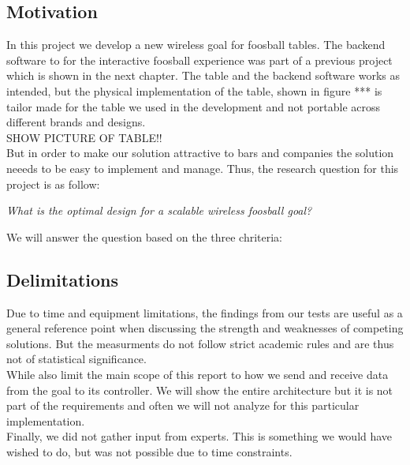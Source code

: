 \subsection{Motivation}
In this project we develop a new wireless goal for foosball tables. The backend software to for the interactive foosball experience was part of a previous project which is shown in the next chapter. The table and the backend software works as intended, but the physical implementation of the table, shown in figure *** is tailor made for the table we used in the development and not portable across different brands and designs. 
\\
SHOW PICTURE OF TABLE!!\\

But in order to make our solution attractive to bars and companies the solution neeeds to be easy to implement and manage. Thus, the research question for this project is as follow:
\begin{center}
    \textit{What is the optimal design for a scalable wireless foosball goal?}
\end{center}
We will answer the question based on the three chriteria: 

\subsection{Delimitations}
Due to time and equipment limitations, the findings from our tests are useful as a general reference point when discussing the strength and weaknesses of competing solutions. But the measurments do not follow strict academic rules and are thus not of statistical significance. \\
While also limit the main scope of this report to how we send and receive data from the goal to its controller. We will show the entire architecture but it is not part of the requirements and often we will not analyze for this particular implementation.\\
Finally, we did not gather input from experts. This is something we would have wished to do, but was not possible due to time constraints.